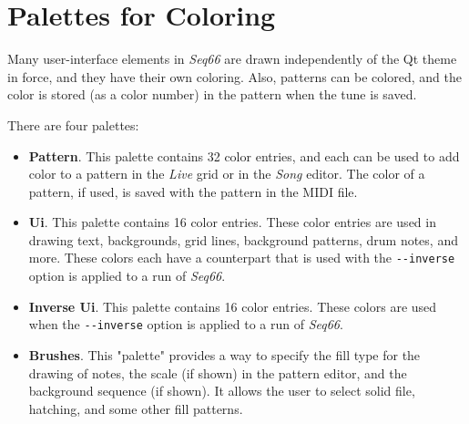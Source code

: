 %
%
%

\section{Palettes for Coloring}
\label{sec:palettes}

   Many user-interface elements in \textsl{Seq66} are drawn independently of
   the Qt theme in force, and they have their own coloring.  Also, patterns can
   be colored, and the color is stored (as a color number) in the pattern when
   the tune is saved.

   There are four palettes:

   \begin{itemize}
      \item \textbf{Pattern}.  This palette contains 32 color entries, and each
         can be used to add color to a pattern in the \textsl{Live} grid or in
         the \textsl{Song} editor.  The color of a pattern, if used, is saved
         with the pattern in the MIDI file.
      \item \textbf{Ui}.  This palette contains 16 color entries.  These
         color entries are used in drawing text, backgrounds, grid lines,
         background patterns, drum notes, and more.  These colors each have a
         counterpart that is used with the \texttt{-{}-inverse} option is applied
         to a run of \textsl{Seq66}.
      \item \textbf{Inverse Ui}.  This palette contains 16 color entries.
         These colors are used when the \texttt{-{}-inverse} option is applied
         to a run of \textsl{Seq66}.
      \item \textbf{Brushes}.  This "palette" provides a way to specify the
         fill type for the drawing of notes, the scale (if shown) in the
         pattern editor, and the background sequence (if shown).  It allows the
         user to select solid file, hatching, and some other fill patterns.
   \end{itemize}

